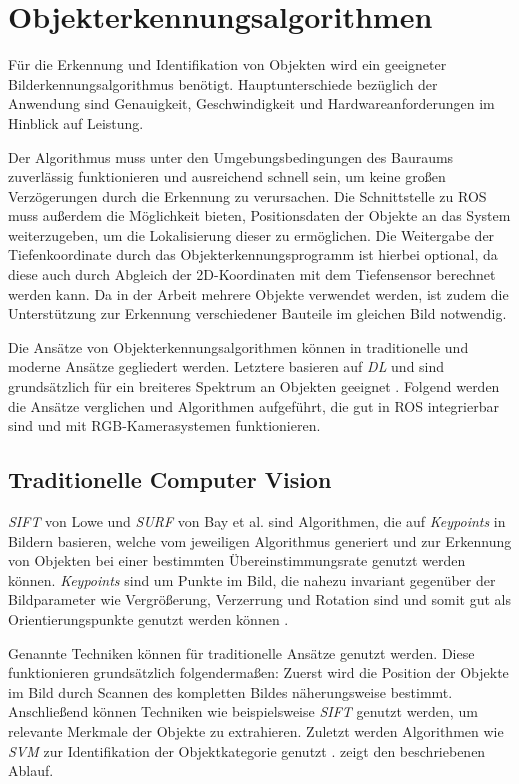 \section{Objekterkennungsalgorithmen}

Für die Erkennung und Identifikation von Objekten wird ein geeigneter Bild\-erkennungsalgorithmus benötigt. Hauptunterschiede bezüglich der Anwendung sind Genauigkeit, Geschwindigkeit und Hardwareanforderungen im Hinblick auf Leistung. 

Der Algorithmus muss unter den Umgebungsbedingungen des Bauraums zuverlässig funktionieren und ausreichend schnell sein, um keine großen Verzögerungen durch die Erkennung zu verursachen. Die Schnittstelle zu \ac{ROS} muss außerdem die Möglichkeit bieten, Positionsdaten der Objekte an das System weiterzugeben, um die Lokalisierung dieser zu ermöglichen. Die Weitergabe der Tiefenkoordinate durch das Objekterkennungsprogramm ist hierbei optional, da diese auch durch Abgleich der 2D-Koordinaten mit dem Tiefensensor berechnet werden kann. Da in der Arbeit mehrere Objekte verwendet werden, ist zudem die Unterstützung zur Erkennung verschiedener Bauteile im gleichen Bild notwendig.

Die Ansätze von Objekterkennungsalgorithmen können in traditionelle und moderne Ansätze gegliedert werden. Letztere basieren auf \textit{\ac{DL}} und sind grundsätzlich für ein breiteres Spektrum an Objekten geeignet \cite[Absatz~2]{mohan_6_2020}. Folgend werden die Ansätze verglichen und Algorithmen aufgeführt, die gut in \ac{ROS} integrierbar sind und mit RGB-Kamerasystemen funktionieren.

\subsection{Traditionelle Computer Vision}

\textit{\ac{SIFT}} von Lowe \cite{lowe_distinctive_2004} und \textit{\ac{SURF}} von Bay et al. \cite{bay_surf_2006} sind Algorithmen, die auf \textit{Keypoints} in Bildern basieren, welche vom jeweiligen Algorithmus generiert und zur Erkennung von Objekten bei einer bestimmten Übereinstimmungsrate genutzt werden können. \textit{Keypoints} sind um Punkte im Bild, die nahezu invariant gegenüber der Bildparameter wie Vergrößerung, Verzerrung und Rotation sind und somit gut als Orientierungspunkte genutzt werden können \cite[Kapitel~13]{lowe_distinctive_2004}.

Genannte Techniken können für traditionelle Ansätze genutzt werden. Diese funktionieren grundsätzlich folgendermaßen: Zuerst wird die Position der Objekte im Bild durch Scannen des kompletten Bildes näherungsweise bestimmt. Anschließend können Techniken wie beispielsweise \textit{\ac{SIFT}} genutzt werden, um relevante Merkmale der Objekte zu extrahieren. Zuletzt werden Algorithmen wie \textit{\ac{SVM}} \cite{cortes_support-vector_1995} zur Identifikation der Objektkategorie genutzt \cite[Kapitel~1]{youzi_review_2020}.  zeigt den beschriebenen Ablauf.

